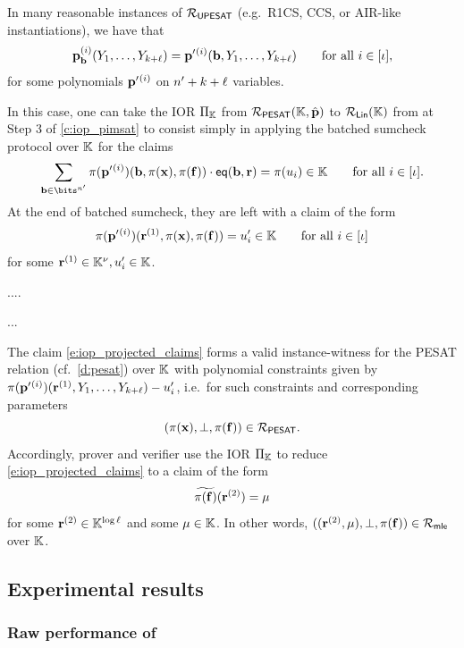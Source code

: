 \documentclass[11pt,letterpaper,usenames,dvipsnames]{article}
\begin{document}
\begin{remark}
 In many reasonable instances of $\mathcal{R}_{\mathsf{UPESAT}}$ (e.g.\ R1CS, CCS, or AIR-like instantiations), we  have that $$\mathbf{p}_{\mathbf{b}}^{(i)}(Y_1, \ldots, Y_{k+\ell}) = \mathbf{p}'{}^{(i)}(\mathbf{b},Y_1, \ldots, Y_{k+\ell}) \qquad \text{for all } i\in [\iota],$$
for some polynomials $\mathbf{p}'{}^{(i)}$ on $n'+k+\ell$  variables. 


In this case, one can take the IOR $\Pi_{\mathbb{K}}$  from $\mathcal{R}_{\mathsf{PESAT}}(\mathbb{K},\hat{\mathbf{p}})$ to $\mathcal{R}_{\mathsf{Lin}}(\mathbb{K})$ from at Step 3 of \cref{c:iop_pimsat} to consist simply in applying the batched sumcheck protocol over $\mathbb{K}$ for the claims 
$$
\sum_{\bb\in \bits^{n'}}\pi(\pp'{}^{(i)})(\bb,\pi(\xx),\pi(\bff)) \cdot \eq(\bb, \rr) = \pi(u_i) \in \KK \qquad \text{for all } i\in [\iota].
$$
%
At the end of  batched sumcheck, they are left with a claim of the form
%
\begin{equation}\label{e:iop_projected_claims}
\pi(\mathbf{p}'{}^{(i)})(\mathbf{r}^{(1)}, \pi(\mathbf{x}),\pi(\mathbf{f})) = u_i' \in \mathbb{K} \qquad \text{for all } i \in [\iota]
\end{equation}
for some $\mathbf{r}^{(1)} \in \mathbb{K}^\nu, u_i' \in \mathbb{K}$. 
%

....

...


The claim \eqref{e:iop_projected_claims} forms a valid instance-witness for the PESAT relation (cf.\ \cref{d:pesat}) over $\mathbb{K}$ with polynomial constraints given by $\pi(\mathbf{p}'{}^{(i)})(\mathbf{r}^{(1)}, Y_1, \ldots, Y_{k+\ell})-u_i'$, i.e.\ for such constraints and corresponding parameters
%
$$
(\pi(\mathbf{x}), \bot, \pi(\mathbf{f}))\in \mathcal{R}_{\mathsf{PESAT}}.
$$
%
 Accordingly, prover and verifier use the IOR $\Pi_{\mathbb{K}}$  to reduce \eqref{e:iop_projected_claims} to 
 a claim of the form
\begin{equation}
{\widetilde{\pi(\mathbf{f})}}(\mathbf{r}^{(2)}) = \mu
\end{equation}
%
for some $\mathbf{r}^{(2)} \in \mathbb{K}^{\log \ell}$  and some $\mu\in \mathbb{K}$. In other words, $((\mathbf{r}^{(2)},\mu),\bot,\pi(\mathbf{f})) \in \mathcal{R}_{\mathsf{mle}}$ over $\mathbb{K}$.
\end{remark}



\subsection{Experimental results}


\subsubsection{Raw performance of \ftwoz}
\end{document}
